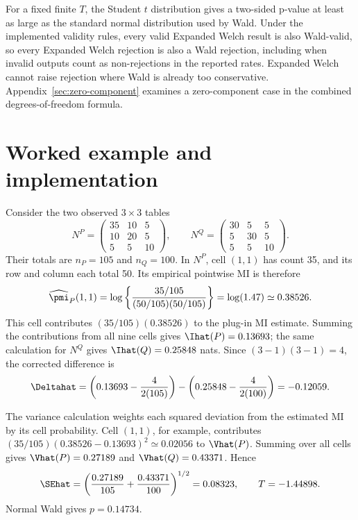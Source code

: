 For a fixed finite \(T\), the Student \(t\) distribution gives a two-sided
p-value at least as large as the standard normal distribution used by Wald.
Under the implemented validity rules, every valid Expanded Welch result is
also Wald-valid, so every Expanded Welch rejection is also a Wald
rejection, including when invalid
outputs count as non-rejections in the reported rates. Expanded Welch cannot
raise rejection where Wald is already too conservative.
Appendix~\ref{sec:zero-component} examines a zero-component case in the
combined degrees-of-freedom formula.

\section{Worked example and implementation}

Consider the two observed \(3\times3\) tables
\begin{equation}
  N^P=
  \begin{pmatrix}
  35&10&5\\
  10&20&5\\
  5&5&10
  \end{pmatrix},
  \qquad
  N^Q=
  \begin{pmatrix}
  30&5&5\\
  5&30&5\\
  5&5&10
  \end{pmatrix}.
  \label{eq:worked-tables}
\end{equation}
Their totals are \(n_P=105\) and \(n_Q=100\). In \(N^P\), cell
\((1,1)\) has count 35, and its row and column each total 50. Its empirical
pointwise MI is therefore
\begin{equation*}
 \widehat\pmi_P(1,1)
 =\log\left\{\frac{35/105}{(50/105)(50/105)}\right\}
 =\log(1.47)\simeq0.38526.
\end{equation*}
This cell contributes \((35/105)(0.38526)\) to the plug-in MI estimate.
Summing the contributions from all nine cells gives
\(\Ihat(P)=0.13693\); the same calculation for \(N^Q\) gives
\(\Ihat(Q)=0.25848\) nats. Since \((3-1)(3-1)=4\), the corrected difference is
\begin{equation}
  \Deltahat
  =\left(0.13693-\frac{4}{2(105)}\right)
  -\left(0.25848-\frac{4}{2(100)}\right)
  =-0.12059.
\end{equation}

The variance calculation weights each squared deviation from the estimated
MI by its cell probability. Cell \((1,1)\), for example, contributes
\((35/105)(0.38526-0.13693)^2\simeq0.02056\) to \(\Vhat(P)\).
Summing over all cells gives \(\Vhat(P)=0.27189\) and
\(\Vhat(Q)=0.43371\). Hence
\begin{equation}
  \SEhat
  =\left(\frac{0.27189}{105}+\frac{0.43371}{100}\right)^{1/2}
  =0.08323,
  \qquad
  T=-1.44898.
\end{equation}
Normal Wald gives \(p=0.14734\).

